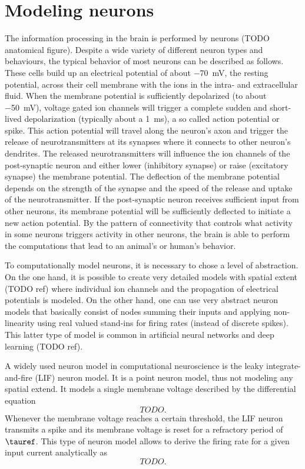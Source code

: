 \chapter{Modeling neurons}
The information processing in the brain is performed by neurons (TODO anatomical figure).
Despite a wide variety of different neuron types and behaviours, the typical behavior of most neurons can be described as follows.
These cells build up an electrical potential of about \SI{-70}{\milli\volt}, the resting potential, across their cell membrane with the ions in the intra- and extracellular fluid.
When the membrane potential is sufficiently depolarized (to about \SI{-50}{\milli\volt}), voltage gated ion channels will trigger a complete sudden and short-lived depolarization (typically about a \SI{1}{\milli\second}), a so called action potential or spike.
This action potential will travel along the neuron's axon and trigger the release of neurotransmitters at its synapses where it connects to other neuron's dendrites.
The released neurotransmitters will influence the ion channels of the post-synaptic neuron and either lower (inhibitory synapse) or raise (excitatory synapse) the membrane potential.
The deflection of the membrane potential depends on the strength of the synapse and the speed of the release and uptake of the neurotransmitter.
If the post-synaptic neuron receives sufficient input from other neurons, its membrane potential will be sufficiently deflected to initiate a new action potential.
By the pattern of connectivity that controls what activity in some neurons triggers activity in other neurons, the brain is able to perform the computations that lead to an animal's or human's behavior.

To computationally model neurons, it is necessary to chose a level of abstraction.
On the one hand, it is possible to create very detailed models with spatial extent (TODO ref) where individual ion channels and the propagation of electrical potentials is modeled.
On the other hand, one can use very abstract neuron models that basically consist of nodes summing their inputs and applying non-linearity using real valued stand-ins for firing rates (instead of discrete spikes).
This latter type of model is common in artificial neural networks and deep learning (TODO ref).

A widely used neuron model in computational neuroscience is the leaky integrate-and-fire (LIF) neuron model.
It is a point neuron model, thus not modeling any spatial extend.
It models a single membrane voltage described by the differential equation
\begin{equation}
    TODO \text{.}
\end{equation}
Whenever the membrane voltage reaches a certain threshold, the LIF neuron transmits a spike and its membrane voltage is reset for a refractory period of $\tauref$.
This type of neuron model allows to derive the firing rate for a given input current analytically as
\begin{equation}
    TODO \text{.}
\end{equation}

